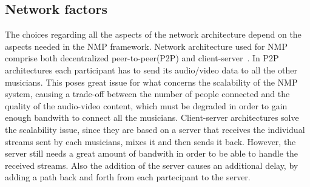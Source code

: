 
\subsection{Network factors}\label{subsec:network}
The choices regarding all the aspects of the network architecture depend on the aspects needed in the NMP framework. 
Network architecture used for NMP comprise both decentralized peer-to-peer(P2P) and client-server~\cite{RottondiOverview}. In P2P architectures each participant has to send its audio/video data to all the other musicians. This poses great issue for what concerns the scalability of the NMP system, causing a trade-off between the number of people connected and the quality of the audio-video content, which must be degraded in order to gain enough bandwith to connect all the musicians.
Client-server architectures solve the scalability issue, since they are based on a server that receives the individual streams sent by each musicians, mixes it and then sends it back. However, the server still needs a great amount of bandwith in order to be able to handle the received streams. Also the addition of the server causes an additional delay, by adding a path back and forth from each partecipant to the server.


